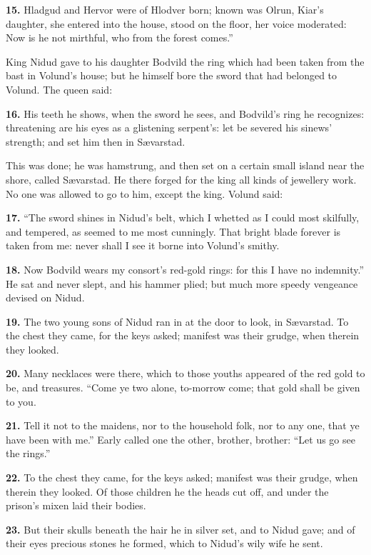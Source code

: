 \textbf{15.} Hladgud and Hervor were of Hlodver born; known was Olrun, Kiar's
daughter, she entered into the house, stood on the floor, her voice
moderated: Now is he not mirthful, who from the forest comes.''

King Nidud gave to his daughter Bodvild the ring which had been taken
from the bast in Volund's house; but he himself bore the sword that
had belonged to Volund. The queen said:

\textbf{16.} His teeth he shows, when the sword he sees, and Bodvild's ring
he recognizes: threatening are his eyes as a glistening serpent's: let
be severed his sinews' strength; and set him then in Sævarstad.

This was done; he was hamstrung, and then set on a certain small
island near the shore, called Sævarstad. He there forged for the king
all kinds of jewellery work. No one was allowed to go to him, except
the king. Volund said:

\textbf{17.} ``The sword shines in Nidud's belt, which I whetted as I could
most skilfully, and tempered, as seemed to me most cunningly. That
bright blade forever is taken from me: never shall I see it borne into
Volund's smithy.

\textbf{18.} Now Bodvild wears my consort's red-gold rings: for this I have
no indemnity.'' He sat and never slept, and his hammer plied; but much
more speedy vengeance devised on Nidud.

\textbf{19.} The two young sons of Nidud ran in at the door to look, in
Sævarstad. To the chest they came, for the keys asked; manifest was
their grudge, when therein they looked.

\textbf{20.} Many necklaces were there, which to those youths appeared of the
red gold to be, and treasures. ``Come ye two alone, to-morrow come;
that gold shall be given to you.

\textbf{21.} Tell it not to the maidens, nor to the household folk, nor to
any one, that ye have been with me.'' Early called one the other,
brother, brother: ``Let us go see the rings.''

\textbf{22.} To the chest they came, for the keys asked; manifest was their
grudge, when therein they looked. Of those children he the heads cut
off, and under the prison's mixen laid their bodies.

\textbf{23.} But their skulls beneath the hair he in silver set, and to Nidud
gave; and of their eyes precious stones he formed, which to Nidud's
wily wife he sent.


